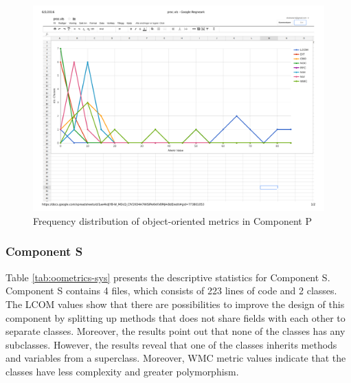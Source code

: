 \begin{landscape}
\setlength\LTleft{-.5in}
	\begin{figure}
	\centering
	\includegraphics[width=\textwidth]{images/pdf/process.pdf}
	\caption{Frequency distribution of object-oriented metrics in Component P}
	\label{fig:procgraph}
	\end{figure}
\end{landscape}



\subsubsection{Component S}
Table \ref{tab:oometrics-sys} presents the descriptive statistics for Component S. Component S contains 4 files, which consists of 223 lines of code and 2 classes. The LCOM values show that there are possibilities to improve the design of this component by splitting up methods that does not share fields with each other to separate classes. Moreover, the results point out that none of the classes has any subclasses. However, the results reveal that one of the classes inherits methods and variables from a superclass. Moreover, WMC metric values indicate that the classes have less complexity and greater polymorphism.

